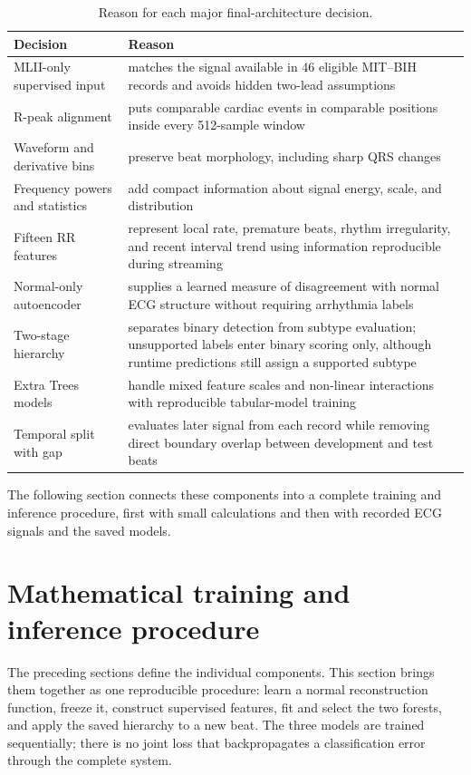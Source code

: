 \begin{table}[H]
\centering
\caption{Reason for each major final-architecture decision.}
\label{tab:final-design-rationale}
\begin{tabular}{>{\raggedright\arraybackslash}p{3.6cm}>{\raggedright\arraybackslash}p{9.6cm}}
\toprule
Decision & Reason\\
\midrule
MLII-only supervised input & matches the signal available in 46 eligible
MIT--BIH records and avoids hidden two-lead assumptions\\
R-peak alignment & puts comparable cardiac events in comparable positions
inside every 512-sample window\\
Waveform and derivative bins & preserve beat morphology, including sharp QRS
changes\\
Frequency powers and statistics & add compact information about signal energy,
scale, and distribution\\
Fifteen RR features & represent local rate, premature beats, rhythm
irregularity, and recent interval trend using information reproducible during
streaming\\
Normal-only autoencoder & supplies a learned measure of disagreement with
normal ECG structure without requiring arrhythmia labels\\
Two-stage hierarchy & separates binary detection from subtype evaluation;
unsupported labels enter binary scoring only, although runtime predictions
still assign a supported subtype\\
Extra Trees models & handle mixed feature scales and non-linear interactions
with reproducible tabular-model training\\
Temporal split with gap & evaluates later signal from each record while
removing direct boundary overlap between development and test beats\\
\bottomrule
\end{tabular}
\end{table}


The following section connects these components into a complete training
and inference procedure, first with small calculations and then with recorded
ECG signals and the saved models.

\section{Mathematical training and inference procedure}
\label{sec:method-training-inference}

The preceding sections define the individual components. This section brings
them together as one reproducible procedure: learn a normal reconstruction
function, freeze it, construct supervised features, fit and select the two
forests, and apply the saved hierarchy to a new beat. The three models are
trained sequentially; there is no joint loss that backpropagates a
classification error through the complete system.

